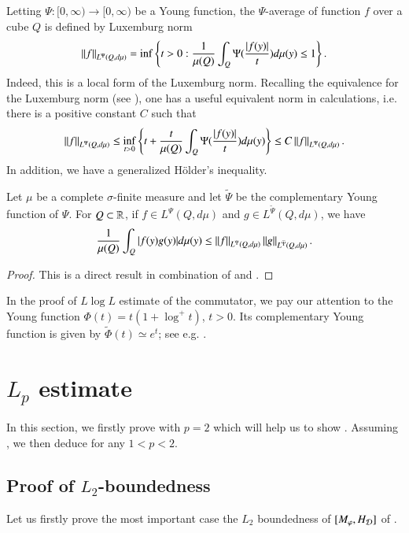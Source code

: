 \documentclass[leqno]{amsart}
\begin{document}
Letting $\Psi:[0,\infty)\to[0,\infty)$ be a Young function, the $\Psi$-average of function $f$ over a cube $Q$ is defined by Luxemburg norm $$\left\| f \right\|_{L^{\Psi}(Q,d\mu)}=\inf\left\{ t>0:\frac{1}{\mu(Q)}\int_{Q}\Psi(\frac{|f(y)|}{t})d\mu(y)\leq1 \right\}.$$
Indeed, this is a local form of the Luxemburg norm. Recalling the equivalence for the Luxemburg norm (see \cite[Remarks 4.8.9]{PKJF-book}), one has a useful equivalent norm in calculations, i.e. there is a positive constant $C$ such that
\begin{align}\label{equivalent norm}
\left\| f \right\|_{L^{\Psi}(Q,d\mu)}
\leq\inf_{t>0}\left\{ t+\frac{t}{\mu(Q)}\int_{Q}\Psi(\frac{|f(y)|}{t})d\mu(y) \right\}
\leq C\left\| f \right\|_{L^{\Psi}(Q,d\mu)}.
\end{align} 
In addition, we have a generalized H\"{o}lder's inequality.
\begin{lemma}\label{Holder inequality}
Let $\mu$ be a complete $\sigma$-finite measure and let $\widetilde{\Psi}$ be the complementary Young function of $\Psi$. For $Q\subset{\mathbb R}$, if $f\in L^{\Psi}(Q,d\mu)$ and $g\in L^{\widetilde{\Psi}}(Q,d\mu)$, we have
\begin{align*}
\frac{1}{\mu(Q)}\int_{Q}|f(y)g(y)|d\mu(y)
\leq\left\| f \right\|_{L^{\Psi}(Q,d\mu)}\left\| g \right\|_{L^{\widetilde{\Psi}}(Q,d\mu)}.
\end{align*}
\end{lemma}
\begin{proof}
This is a direct result in combination of \cite[Theorem 4.7.5]{PKJF-book} and  \cite[Theorem 4.8.5]{PKJF-book}.
\end{proof}
In the proof of $L\log L$ estimate of the commutator, we pay our attention to the Young function $\Phi(t)=t(1+\log^{+}t)$, $t>0$. Its complementary Young function is given by $\widetilde{\Phi}(t)\simeq e^{t}$; see e.g.  \cite[Section 4.3]{PKJF-book}.



\section{$L_{p}$ estimate}\label{sec-Lpe}
In this section, we firstly prove  with $p=2$ which will help us to show . Assuming , we then deduce  for any $1<p<2$.


\subsection{Proof of $L_{2}$-boundedness}
Let us firstly prove the most important case the $L_{2}$ boundedness of $[M_{\varphi},H_{{\mathcal D}}]$ of .
\end{document}
